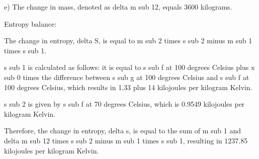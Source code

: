 e) The change in mass, denoted as delta m sub 12, equals 3600 kilograms.

Entropy balance:

The change in entropy, delta S, is equal to m sub 2 times s sub 2 minus m sub 1 times s sub 1.

s sub 1 is calculated as follows: it is equal to s sub f at 100 degrees Celsius plus x sub 0 times the difference between s sub g at 100 degrees Celsius and s sub f at 100 degrees Celsius, which results in 1.33 plus 14 kilojoules per kilogram Kelvin.

s sub 2 is given by s sub f at 70 degrees Celsius, which is 0.9549 kilojoules per kilogram Kelvin.

Therefore, the change in entropy, delta s, is equal to the sum of m sub 1 and delta m sub 12 times s sub 2 minus m sub 1 times s sub 1, resulting in 1237.85 kilojoules per kilogram Kelvin.
